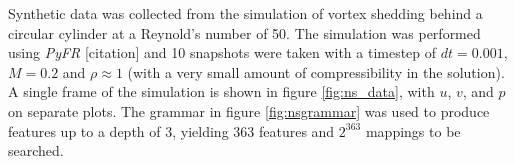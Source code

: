 \documentclass{article}
\begin{document}
Synthetic data was collected from the simulation of vortex shedding behind a circular cylinder at a Reynold's number of 50. The simulation was performed using \emph{PyFR} [citation] and 10 snapshots were taken with a timestep of $dt = 0.001$, $M = 0.2$ and $\rho \approx 1$ (with a very small amount of compressibility in the solution). A single frame of the simulation is shown in figure \ref{fig:ns_data}, with $u$, $v$, and $p$ on separate plots. The grammar in figure \ref{fig:nsgrammar} was used to produce features up to a depth of 3, yielding 363 features and $2^{363}$ mappings to be searched.

\begin{figure}
  \vskip 0.2in
     \\
     \\

\end{figure}
\end{document}
